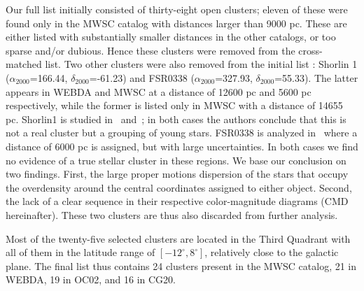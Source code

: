 \documentclass[referee]{aa}
\begin{document}
 Our full list initially consisted of thirty-eight open clusters; eleven of
 these were found only in the MWSC catalog with distances larger than 9000 pc.
 These are either listed with substantially smaller distances in the other
 catalogs, or too sparse and/or dubious. Hence these clusters were removed from
 the cross-matched list.
 Two other clusters were also removed from the initial list : Shorlin 1 
 ($\alpha_{2000}$=166.44, $\delta_{2000}$=-61.23) and FSR0338
 ($\alpha_{2000}$=327.93, $\delta_{2000}$=55.33). The latter appears in WEBDA and
 MWSC at a distance of 12600 pc and 5600 pc respectively, while the former is
 listed only in MWSC with a distance of 14655 pc. Shorlin1 is studied
 in~\cite{Carraro_2009} and~\cite{Turner_2012}; in both cases the authors
 conclude that this is not a real cluster but a grouping of young stars.
 FSR0338 is analyzed in~\cite{Froebrich_2010} where a distance of 6000 pc is
 assigned, but with large uncertainties.
 In both cases we find no evidence of a true stellar cluster in these regions.
 We base our conclusion on two findings. First, the large proper motions
 dispersion of the stars that occupy the overdensity around the central
 coordinates assigned to either object. Second, the lack of a clear sequence in
 their respective color-magnitude diagrams (CMD hereinafter). These two clusters
 are thus also discarded from further analysis.

 Most of the twenty-five selected clusters are located in the Third Quadrant
 with all of them in the latitude range of $\left[-12^{\circ}, 8^{\circ}\right]$,
 relatively close to the galactic plane. The final list thus contains 24
 clusters present in the MWSC catalog, 21 in WEBDA, 19 in OC02, and 16 in
 CG20.\\
\end{document}
